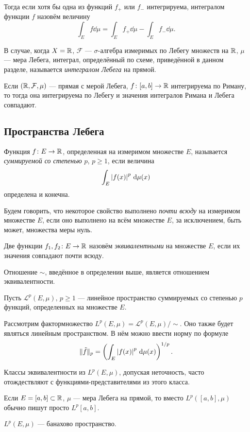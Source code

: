 Тогда если хотя бы одна из функций $f_+$ или $f_-$ интегрируема, интегралом
функции $f$ назовём величину
\[ \int_E f \dd \mu = \int_E f_+ \dd \mu - \int_E f_- \dd \mu. \]

\begin{definition}
    В случае, когда $X = \mathbb{R}$, $\mathcal F$ --- $\sigma$-алгебра измеримых по Лебегу
    множеств на $\mathbb{R}$, $\mu$ --- мера Лебега, интеграл, определённый по схеме,
    приведённой в данном разделе, называется \emph{интегралом Лебега} на прямой.
\end{definition}

\begin{theorem}
    Если $(\mathbb{R}, \mathcal F, \mu)$ --- прямая с мерой Лебега, $f \colon [a,
    b] \to \mathbb{R}$ интегрируема по Риману, то тогда она интегрируема по Лебегу
    и значения интегралов Римана и Лебега совпадают.
\end{theorem}

\subsection{Пространства Лебега}
\begin{definition}
    Функция $f \colon E \to \mathbb{R}$, определенная на измеримом множестве $E$,
    называется \emph{суммируемой со степенью $p$}, $p \geq 1$, если величина
    \[ \int_{E} \left|f(x)\right|^p \,\mathrm{d} \mu(x) \]
    определена и конечна.
\end{definition}

\begin{definition}
    Будем говорить, что некоторое свойство выполнено \emph{почти всюду} на измеримом
    множестве $E$, если оно выполнено на всём множестве $E$, за исключением,
    быть может, множества меры нуль.
\end{definition}

\begin{definition}
    Две функции $f_1, f_2 \colon E \to \mathbb{R}$ назовём \emph{эквивалентными} на множестве $E$, если их
    значения совпадают почти всюду.
\end{definition}

Отношение $\sim$, введённое в определении выше, является отношением эквивалентности.

Пусть $\mathcal L^p(E, \mu), \, p \geq 1$ --- линейное пространство суммируемых со степенью
$p$ функций, определенных на множестве $E$.

Рассмотрим фактормножество $L^p(E, \mu) = \mathcal L^p(E, \mu)/\!\sim$. Оно также будет являться линейным
пространством. В нём можно ввести норму по формуле
\[ \|\tilde{f}\|_p = \left( \int_E \left|f(x)\right|^p \,\mathrm{d} \mu(x)
\right)^{1/p}. \]

Классы эквивалентности из $L^p(E, \mu)$, допуская неточность, часто отождествляют с
функ\-ци\-я\-ми-представителями из этого класса.

Если $E = [a,b] \subset \mathbb{R}$, $\mu$ --- мера Лебега на прямой, то вместо
$L^p([a,b], \mu)$ обычно пишут просто $L^p[a,b]$.

\begin{theorem}[Лебега]
    $L^p(E, \mu)$ --- банахово пространство.
\end{theorem}
